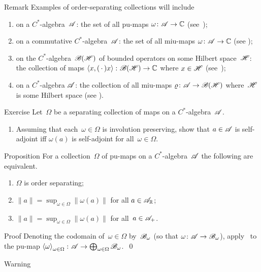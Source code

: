 \documentclass[a]{subfiles}
\begin{document}
\begin{parsec}
\begin{point}{Remark}
Examples of order-separating
collections will include
\begin{enumerate}
\item
on a $C^*$-algebra~$\mathscr{A}$:
the set of all pu-maps $\omega\colon \mathscr{A}\to\mathbb{C}$
(see~);
\item
on a commutative $C^*$-algebra~$\mathscr{A}$:
the set of all miu-maps $\omega\colon \mathscr{A}\to\mathbb{C}$
(see \TODO{});
\item
on the $C^*$-algebra~$\mathscr{B}(\mathscr{H})$
of bounded operators on some Hilbert space~$\mathscr{H}$:
the collection of maps  $\left<x,(\,\cdot\,)x\right>
\colon \mathscr{B}(\mathscr{H})\to\mathbb{C}$ where $x\in \mathscr{H}$
(see~);
\item
on a $C^*$-algebra $\mathscr{A}$:
the collection of all miu-maps $\varrho\colon \mathscr{A}\to\mathscr{B}(\mathscr{H})$
where~$\mathscr{H}$ is some Hilbert space (see \TODO{}).
\end{enumerate}
\end{point}
\begin{point}{Exercise}%
Let~$\Omega$ be a separating collection of maps on a $C^*$-algebra~$\mathscr{A}$.
\begin{enumerate}
\item
Assuming that each~$\omega\in\Omega$ is involution preserving,
show that $a\in\mathscr{A}$ is self-adjoint
iff $\omega(a)$ is self-adjoint for all~$\omega\in\Omega$.
\end{enumerate}
\end{point}
\begin{point}{Proposition}%
For a collection~$\Omega$ of pu-maps on a $C^*$-algebra~$\mathscr{A}$
the following are equivalent.
\begin{enumerate}
\item 
	$\Omega$ is order separating;
\item
	$\|a\|= \sup_{\omega\in\Omega} \left\|\omega(a)\right\|$
	for all $a\in \mathscr{A}_{\mathbb{R}}$;
\item
	$\|a\| = \sup_{\omega\in\Omega} \left\|\omega(a)\right\|$
	for all~$a\in \mathscr{A}_{+}$.
\end{enumerate}
\begin{point}{Proof}%
Denoting the codomain of~$\omega\in\Omega$
by~$\mathscr{B}_\omega$
(so that $\omega\colon \mathscr{A}\to\mathscr{B}_\omega$),
apply~
to the pu-map $\left<\omega\right>_{\omega\in\Omega}\colon 
\mathscr{A}\to\bigoplus_{\omega\in\Omega}
\mathscr{B}_\omega$.~\qed
\end{point}
\begin{point}{Warning}%

\end{point}
\end{point}
\end{parsec}
\end{document}
